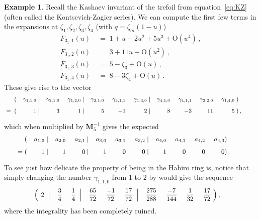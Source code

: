\documentclass[12pt,reqno]{amsart}
\theoremstyle{definition}
\newtheorem{example}[proposition]{Example}
\def\bM{\mathbf{M}}
\def\be{\begin{equation}}
\def\ee{\end{equation}}
\def\z{\zeta}
\def\={\;=\;}
\begin{document}
\begin{example}
Recall the Kashaev invariant of the trefoil from equation~\eqref{eq:KZ}
(often called the Kontsevich-Zagier series). We can compute the first few terms
in the expansions at $\z_1,\z_2,\z_3,\z_4$ (with $q=\z_m(1-u)$)
\be
\begin{aligned}
F_{3_1,1}(u)
&\=
1 + u + 2u^2 + 5u^3+\mathrm{O}(u^4)\,,\\
F_{3_1,2}(u)
&\=
3 + 11u+\mathrm{O}(u^2)\,,\\
F_{3_1,3}(u)
&\=
5-\z_3+\mathrm{O}(u)\,,\\
F_{3_1,4}(u)
&\=
8-3\z_4+\mathrm{O}(u)\,.
\end{aligned}
\ee
These give rise to the vector
\be
\begin{small}
\begin{aligned}
&(&\gamma_{1,1,0}&\;|&
\gamma_{2,1,0}&\;&
\gamma_{1,2,0}&\;|&
\gamma_{3,1,0}&\;&
\gamma_{3,1,1}&\;&
\gamma_{1,3,0}&\;|&
\gamma_{4,1,0}&\;&
\gamma_{4,1,1}&\;&
\gamma_{2,2,0}&\;&
\gamma_{1,4,0}\;&)\,\phantom{,,_{2_{2_{2_{2_{2}}}}}}\\
\=\;&(&1 &\;|& 3 &\;& 1 &\;|& 5 &\;& -1 &\;& 2 &\;|
& 8 &\;& -3 &\;& 11 &\;& 5\;&)\,,\phantom{,_{2_{2_{2_{2_{2}}}}}}
\end{aligned}
\end{small}
\ee
which when multiplied by $\bM_5^{-1}$ gives the expected
\be
\begin{small}
\begin{aligned}
&(&a_{1,0}&\;|&
a_{2,0}&\;&
a_{2,1}&\;|&
a_{3,0}&\;&
a_{3,1}&\;&
a_{3,2}&\;|&
a_{4,0}&\;&
a_{4,1}&\;&
a_{4,2}&\;&
a_{4,3}&)\,\phantom{.,_{2_{2_{2_{2_{2}}}}}}\\
\=&(&1 &\;|& 1 &\;& 0 &\;|& 1 &\;& 0 &\;& 0 &\;|
& 1 &\;& 0 &\;& 0 &\;& 0&)\,.\phantom{,_{2_{2_{2_{2_{2}}}}}}
\end{aligned}
\end{small}
\ee
To see just how delicate the property of being in the Habiro ring is, notice
that simply changing the number $\gamma_{1,1,0}$ from $1$ to $2$ by would give
the sequence
\be
\begin{small}
\begin{aligned}
&\Big(\!\!\!\!&2 \;&\;\Big|& \frac{3}{4} &\;
& \frac{1}{4}\; &\;\Big|& \frac{65}{72} &\;& \frac{-1}{72}
&\;& \frac{17}{72}\; &\;\Big|& \frac{275}{288} &\;& \frac{-7}{144} &\;& \frac{1}{32}
&\;& \frac{17}{72}\;&\Big)\,,
\end{aligned}
\end{small}
\ee
where the integrality has been completely ruined.
\end{example}
\end{document}
